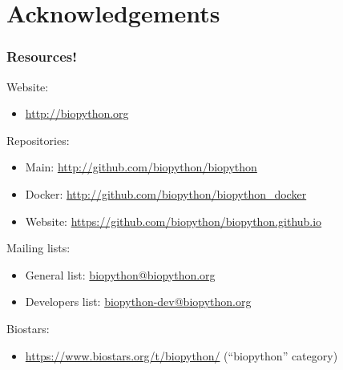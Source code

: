 \documentclass[trans]{beamer}
\begin{document}
\section*{Acknowledgements}
\frame
{
  \frametitle{Resources!}

  Website:\\
  \begin{itemize}
  \item \url{http://biopython.org}
  \end{itemize}

  Repositories:\\
  \begin{itemize}
  \item Main: \url{http://github.com/biopython/biopython}
  \item Docker: \url{http://github.com/biopython/biopython_docker}
  \item Website: \url{https://github.com/biopython/biopython.github.io}
  \end{itemize}

  Mailing lists:
  \begin{itemize}
  \item General list: \url{biopython@biopython.org}
  \item Developers list: \url{biopython-dev@biopython.org}
  \end{itemize}

  Biostars:
  \begin{itemize}
  \item \url{https://www.biostars.org/t/biopython/} (``biopython'' category)
  \end{itemize}
}
\end{document}
